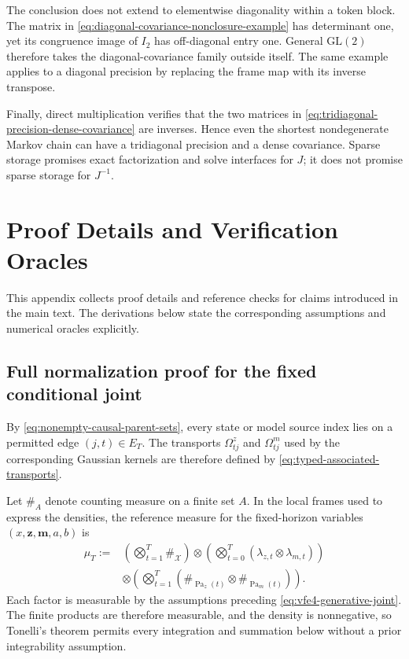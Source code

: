 The conclusion does not extend to elementwise diagonality within a token block.  The matrix in \cref{eq:diagonal-covariance-nonclosure-example} has determinant one, yet its congruence image of $I_2$ has off-diagonal entry one.  General $\mathrm{GL}(2)$ therefore takes the diagonal-covariance family outside itself.  The same example applies to a diagonal precision by replacing the frame map with its inverse transpose.

Finally, direct multiplication verifies that the two matrices in \cref{eq:tridiagonal-precision-dense-covariance} are inverses.  Hence even the shortest nondegenerate Markov chain can have a tridiagonal precision and a dense covariance.  Sparse storage promises exact factorization and solve interfaces for $J$; it does not promise sparse storage for $J^{-1}$.

\chapter{Proof Details and Verification Oracles}

This appendix collects proof details and reference checks for claims introduced in the main text. The derivations below state the corresponding assumptions and numerical oracles explicitly.

\section{Full normalization proof for the fixed conditional joint}

By \cref{eq:nonempty-causal-parent-sets}, every state or model source index lies on a permitted edge $(j,t)\in E_T$.  The transports $\Omega^z_{tj}$ and $\Omega^m_{tj}$ used by the corresponding Gaussian kernels are therefore defined by \cref{eq:typed-associated-transports}.

Let $\#_A$ denote counting measure on a finite set $A$.  In the local frames used to express the densities, the reference measure for the fixed-horizon variables $(x,\boldsymbol z,\boldsymbol m,a,b)$ is
\begin{equation}
\begin{aligned}
\mu_T
:={}&\left(\bigotimes_{t=1}^{T}\#_{\mathcal X}\right)
\otimes\left(\bigotimes_{t=0}^{T}
(\lambda_{z,t}\otimes\lambda_{m,t})\right)\\
&\otimes\left(\bigotimes_{t=1}^{T}
(\#_{\operatorname{Pa}_z(t)}\otimes
\#_{\operatorname{Pa}_m(t)})\right).
\end{aligned}
\label{eq:full-joint-reference-measure}
\end{equation}
Each factor is measurable by the assumptions preceding \cref{eq:vfe4-generative-joint}.  The finite products are therefore measurable, and the density is nonnegative, so Tonelli's theorem permits every integration and summation below without a prior integrability assumption.

